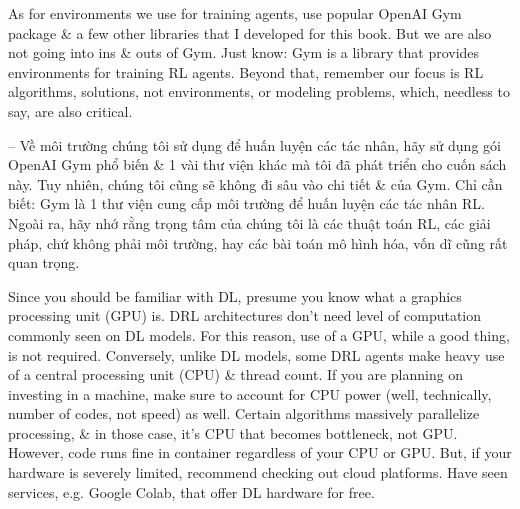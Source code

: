\documentclass{article}
\begin{document}
\begin{itemize}
\begin{itemize}
\begin{itemize}
            As for environments we use for training agents, use popular OpenAI Gym package \& a few other libraries that I developed for this book. But we are also not going into ins \& outs of Gym. Just know: Gym is a library that provides environments for training RL agents. Beyond that, remember our focus is RL algorithms, solutions, not environments, or modeling problems, which, needless to say, are also critical.

            -- Về môi trường chúng tôi sử dụng để huấn luyện các tác nhân, hãy sử dụng gói OpenAI Gym phổ biến \& 1 vài thư viện khác mà tôi đã phát triển cho cuốn sách này. Tuy nhiên, chúng tôi cũng sẽ không đi sâu vào chi tiết \& của Gym. Chỉ cần biết: Gym là 1 thư viện cung cấp môi trường để huấn luyện các tác nhân RL. Ngoài ra, hãy nhớ rằng trọng tâm của chúng tôi là các thuật toán RL, các giải pháp, chứ không phải môi trường, hay các bài toán mô hình hóa, vốn dĩ cũng rất quan trọng.

            Since you should be familiar with DL, presume you know what a graphics processing unit (GPU) is. DRL architectures don't need level of computation commonly seen on DL models. For this reason, use of a GPU, while a good thing, is not required. Conversely, unlike DL models, some DRL agents make heavy use of a central processing unit (CPU) \& thread count. If you are planning on investing in a machine, make sure to account for CPU power (well, technically, number of codes, not speed) as well. Certain algorithms massively parallelize processing, \& in those case, it's CPU that becomes bottleneck, not GPU. However, code runs fine in container regardless of your CPU or GPU. But, if your hardware is severely limited, recommend checking out cloud platforms. Have seen services, e.g. Google Colab, that offer DL hardware for free.


\end{itemize}
\end{itemize}
\end{itemize}
\end{document}
